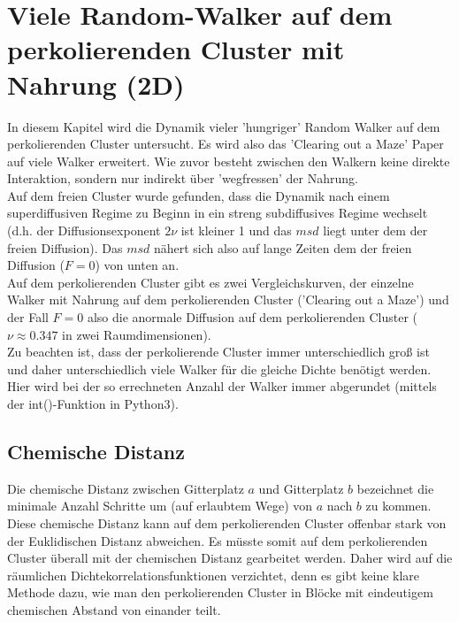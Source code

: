 \documentclass[a4paper, 12pt]{scrartcl}
\author{Sebastian Steinhäuser}
\begin{document}
\tableofcontents
\newpage
\section{Viele Random-Walker auf dem perkolierenden Cluster mit Nahrung (2D)}
In diesem Kapitel wird die Dynamik vieler 'hungriger' Random Walker auf dem perkolierenden Cluster untersucht. Es wird also das 'Clearing out a Maze' Paper auf viele Walker erweitert. Wie zuvor besteht zwischen den Walkern keine direkte Interaktion, sondern nur indirekt über 'wegfressen' der Nahrung.
\\
\noindent Auf dem freien Cluster wurde gefunden, dass die Dynamik nach einem superdiffusiven Regime zu Beginn in ein streng subdiffusives Regime wechselt (d.h. der Diffusionsexponent $2\nu$ ist kleiner 1 und das $msd$ liegt unter dem der freien Diffusion). Das $msd$ nähert sich also auf lange Zeiten dem der freien Diffusion ($F=0$) von unten an.
\\
\noindent Auf dem perkolierenden Cluster gibt es zwei Vergleichskurven, der einzelne Walker mit Nahrung auf dem perkolierenden Cluster ('Clearing out a Maze') und der Fall $F=0$ also die anormale Diffusion auf dem perkolierenden Cluster ($\nu \approx 0.347$ in zwei Raumdimensionen).
\\
\noindent Zu beachten ist, dass der perkolierende Cluster immer unterschiedlich groß ist und daher unterschiedlich viele Walker für die gleiche Dichte benötigt werden. Hier wird bei der so errechneten Anzahl der Walker immer abgerundet (mittels der int()-Funktion in Python3).

\subsection{Chemische Distanz}
Die chemische Distanz zwischen Gitterplatz $a$ und Gitterplatz $b$ bezeichnet die minimale Anzahl Schritte um (auf erlaubtem Wege) von $a$ nach $b$ zu kommen. Diese chemische Distanz kann auf dem perkolierenden Cluster offenbar stark von der Euklidischen Distanz abweichen. Es müsste somit auf dem perkolierenden Cluster überall mit der chemischen Distanz gearbeitet werden. Daher wird auf die räumlichen Dichtekorrelationsfunktionen verzichtet, denn es gibt keine klare Methode dazu, wie man den perkolierenden Cluster in Blöcke mit eindeutigem chemischen Abstand von einander teilt.
\end{document}
